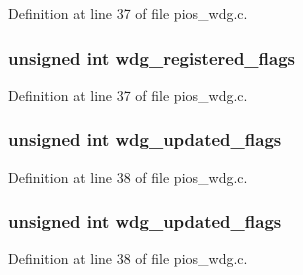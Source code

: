 Definition at line 37 of file pios\-\_\-wdg.\-c.

\hypertarget{group___p_i_o_s___w_d_g_gaab238daf4f2906dc7691f92d408cee6c}{
\subsubsection[{wdg\-\_\-registered\-\_\-flags}]{\setlength{\rightskip}{0pt plus 5cm}unsigned int wdg\-\_\-registered\-\_\-flags}}\label{group___p_i_o_s___w_d_g_gaab238daf4f2906dc7691f92d408cee6c}


Definition at line 37 of file pios\-\_\-wdg.\-c.

\hypertarget{group___p_i_o_s___w_d_g_ga37fde3d7139a4739308ac7a214dbe965}{
\subsubsection[{wdg\-\_\-updated\-\_\-flags}]{\setlength{\rightskip}{0pt plus 5cm}unsigned int wdg\-\_\-updated\-\_\-flags}}\label{group___p_i_o_s___w_d_g_ga37fde3d7139a4739308ac7a214dbe965}


Definition at line 38 of file pios\-\_\-wdg.\-c.

\hypertarget{group___p_i_o_s___w_d_g_ga37fde3d7139a4739308ac7a214dbe965}{
\subsubsection[{wdg\-\_\-updated\-\_\-flags}]{\setlength{\rightskip}{0pt plus 5cm}unsigned int wdg\-\_\-updated\-\_\-flags}}\label{group___p_i_o_s___w_d_g_ga37fde3d7139a4739308ac7a214dbe965}


Definition at line 38 of file pios\-\_\-wdg.\-c.

